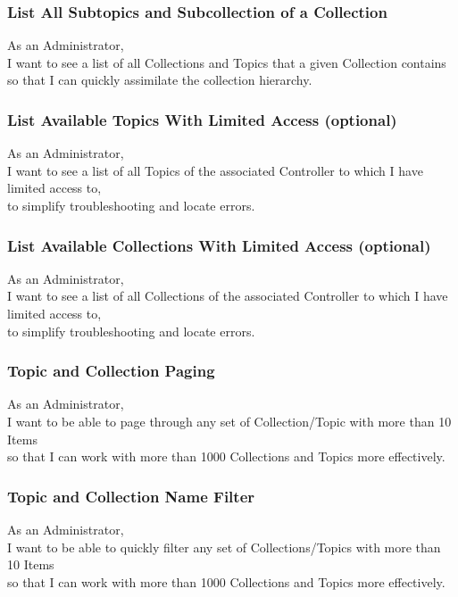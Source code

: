 \subsubsection{List All Subtopics and Subcollection of a Collection}
As an Administrator,\\
I want to see a list of all Collections and Topics that a given Collection contains\\
so that I can quickly assimilate the collection hierarchy.

\subsubsection{List Available Topics With Limited Access (optional)}

As an Administrator,\\
I want to see a list of all Topics of the associated Controller to which I have limited access to,\\
to simplify troubleshooting and locate errors.

\subsubsection{List Available Collections With Limited Access (optional)}

As an Administrator,\\
I want to see a list of all Collections of the associated Controller to which I have limited access to,\\
to simplify troubleshooting and locate errors.

\subsubsection{Topic and Collection Paging}
As an Administrator,\\
I want to be able to page through any set of Collection/Topic with more than 10 Items \\
so that I can work with more than 1000 Collections and Topics more effectively.

\subsubsection{Topic and Collection Name Filter}
As an Administrator,\\
I want to be able to quickly filter any set of Collections/Topics with more than 10 Items \\
so that I can work with more than 1000 Collections and Topics more effectively.


